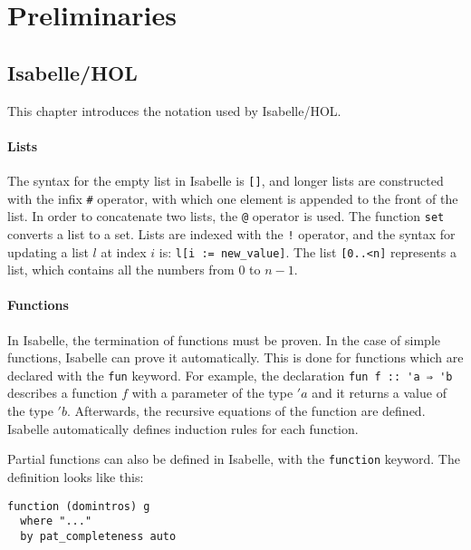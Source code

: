 
\chapter{Preliminaries}\label{chapter:preliminaries}

\section{Isabelle/HOL}

 This chapter introduces the notation used by Isabelle/HOL.

\subsubsection{Lists}

The syntax for the empty list in Isabelle is \lstinline|[]|, and longer lists are constructed with the infix \lstinline|#| operator, with which one element is appended to the front of the list. In order to concatenate two lists, the \lstinline|@| operator is used. The function \lstinline|set| converts a list to a set. Lists are indexed with the \lstinline|!| operator, and the syntax for updating a list $l$ at index $i$ is: \lstinline|l[i := new_value]|. The list \lstinline|[0..<n]| represents a list, which contains all the numbers from $0$ to $n-1$.

\subsubsection{Functions}

In Isabelle, the termination of functions must be proven. In the case of simple functions, Isabelle can prove it automatically. This is done for functions which are declared with the \lstinline{fun} keyword. For example, the declaration \lstinline|fun f :: 'a ⇒ 'b| describes a function $f$ with a parameter of the type $'a$ and it returns a value of the type $'b$. Afterwards, the recursive equations of the function are defined. Isabelle automatically defines induction rules for each function.

Partial functions can also be defined in Isabelle, with the \lstinline{function} keyword.
The definition looks like this:

\begin{lstlisting}
function (domintros) g
  where "..."
  by pat_completeness auto
\end{lstlisting}

